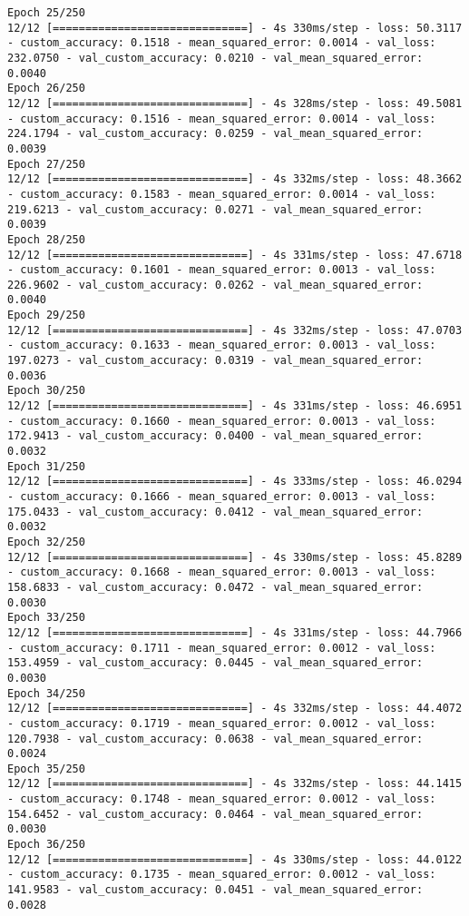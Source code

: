 \begin{lstlisting}
Epoch 25/250
12/12 [==============================] - 4s 330ms/step - loss: 50.3117 - custom_accuracy: 0.1518 - mean_squared_error: 0.0014 - val_loss: 232.0750 - val_custom_accuracy: 0.0210 - val_mean_squared_error: 0.0040
Epoch 26/250
12/12 [==============================] - 4s 328ms/step - loss: 49.5081 - custom_accuracy: 0.1516 - mean_squared_error: 0.0014 - val_loss: 224.1794 - val_custom_accuracy: 0.0259 - val_mean_squared_error: 0.0039
Epoch 27/250
12/12 [==============================] - 4s 332ms/step - loss: 48.3662 - custom_accuracy: 0.1583 - mean_squared_error: 0.0014 - val_loss: 219.6213 - val_custom_accuracy: 0.0271 - val_mean_squared_error: 0.0039
Epoch 28/250
12/12 [==============================] - 4s 331ms/step - loss: 47.6718 - custom_accuracy: 0.1601 - mean_squared_error: 0.0013 - val_loss: 226.9602 - val_custom_accuracy: 0.0262 - val_mean_squared_error: 0.0040
Epoch 29/250
12/12 [==============================] - 4s 332ms/step - loss: 47.0703 - custom_accuracy: 0.1633 - mean_squared_error: 0.0013 - val_loss: 197.0273 - val_custom_accuracy: 0.0319 - val_mean_squared_error: 0.0036
Epoch 30/250
12/12 [==============================] - 4s 331ms/step - loss: 46.6951 - custom_accuracy: 0.1660 - mean_squared_error: 0.0013 - val_loss: 172.9413 - val_custom_accuracy: 0.0400 - val_mean_squared_error: 0.0032
Epoch 31/250
12/12 [==============================] - 4s 333ms/step - loss: 46.0294 - custom_accuracy: 0.1666 - mean_squared_error: 0.0013 - val_loss: 175.0433 - val_custom_accuracy: 0.0412 - val_mean_squared_error: 0.0032
Epoch 32/250
12/12 [==============================] - 4s 330ms/step - loss: 45.8289 - custom_accuracy: 0.1668 - mean_squared_error: 0.0013 - val_loss: 158.6833 - val_custom_accuracy: 0.0472 - val_mean_squared_error: 0.0030
Epoch 33/250
12/12 [==============================] - 4s 331ms/step - loss: 44.7966 - custom_accuracy: 0.1711 - mean_squared_error: 0.0012 - val_loss: 153.4959 - val_custom_accuracy: 0.0445 - val_mean_squared_error: 0.0030
Epoch 34/250
12/12 [==============================] - 4s 332ms/step - loss: 44.4072 - custom_accuracy: 0.1719 - mean_squared_error: 0.0012 - val_loss: 120.7938 - val_custom_accuracy: 0.0638 - val_mean_squared_error: 0.0024
Epoch 35/250
12/12 [==============================] - 4s 332ms/step - loss: 44.1415 - custom_accuracy: 0.1748 - mean_squared_error: 0.0012 - val_loss: 154.6452 - val_custom_accuracy: 0.0464 - val_mean_squared_error: 0.0030
Epoch 36/250
12/12 [==============================] - 4s 330ms/step - loss: 44.0122 - custom_accuracy: 0.1735 - mean_squared_error: 0.0012 - val_loss: 141.9583 - val_custom_accuracy: 0.0451 - val_mean_squared_error: 0.0028

\end{lstlisting}
